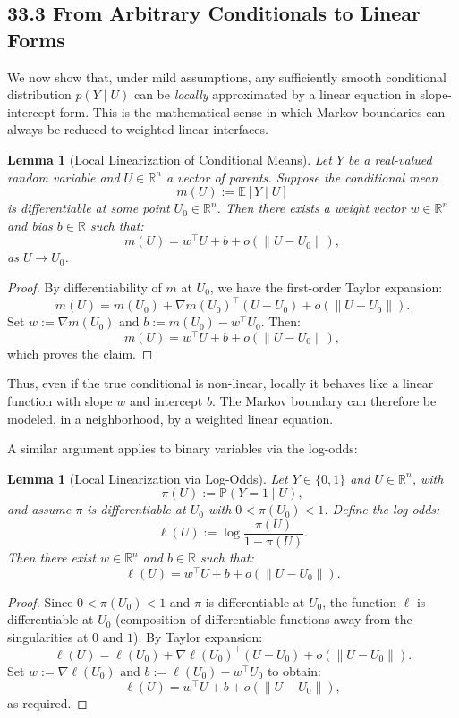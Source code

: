 \documentclass[12pt,letterpaper]{article}
\newtheorem{lemma}[theorem]{Lemma}
\theoremstyle{remark}
\begin{document}
\subsection{33.3 From Arbitrary Conditionals to Linear Forms}

We now show that, under mild assumptions, any sufficiently smooth conditional distribution $p(Y \mid U)$ can be \emph{locally} approximated by a linear equation in slope-intercept form. This is the mathematical sense in which Markov boundaries can always be reduced to weighted linear interfaces.

\begin{lemma}[Local Linearization of Conditional Means]
Let $Y$ be a real-valued random variable and $U \in \mathbb{R}^n$ a vector of parents. Suppose the conditional mean
\[
m(U) := \mathbb{E}[Y \mid U]
\]
is differentiable at some point $U_0 \in \mathbb{R}^n$. Then there exists a weight vector $w \in \mathbb{R}^n$ and bias $b \in \mathbb{R}$ such that:
\[
m(U) = w^\top U + b + o(\|U - U_0\|),
\]
as $U \to U_0$.
\end{lemma}

\begin{proof}
By differentiability of $m$ at $U_0$, we have the first-order Taylor expansion:
\[
m(U) = m(U_0) + \nabla m(U_0)^\top (U - U_0) + o(\|U - U_0\|).
\]
Set $w := \nabla m(U_0)$ and $b := m(U_0) - w^\top U_0$. Then:
\[
m(U) = w^\top U + b + o(\|U - U_0\|),
\]
which proves the claim.
\end{proof}

Thus, even if the true conditional is non-linear, locally it behaves like a linear function with slope $w$ and intercept $b$. The Markov boundary can therefore be modeled, in a neighborhood, by a weighted linear equation.

A similar argument applies to binary variables via the log-odds:

\begin{lemma}[Local Linearization via Log-Odds]
Let $Y \in \{0,1\}$ and $U \in \mathbb{R}^n$, with
\[
\pi(U) := \mathbb{P}(Y=1 \mid U),
\]
and assume $\pi$ is differentiable at $U_0$ with $0 < \pi(U_0) < 1$. Define the log-odds:
\[
\ell(U) := \log \frac{\pi(U)}{1-\pi(U)}.
\]
Then there exist $w \in \mathbb{R}^n$ and $b \in \mathbb{R}$ such that:
\[
\ell(U) = w^\top U + b + o(\|U - U_0\|).
\]
\end{lemma}

\begin{proof}
Since $0 < \pi(U_0) < 1$ and $\pi$ is differentiable at $U_0$, the function $\ell$ is differentiable at $U_0$ (composition of differentiable functions away from the singularities at $0$ and $1$). By Taylor expansion:
\[
\ell(U) = \ell(U_0) + \nabla \ell(U_0)^\top (U - U_0) + o(\|U - U_0\|).
\]
Set $w := \nabla \ell(U_0)$ and $b := \ell(U_0) - w^\top U_0$ to obtain:
\[
\ell(U) = w^\top U + b + o(\|U - U_0\|),
\]
as required.
\end{proof}
\end{document}

